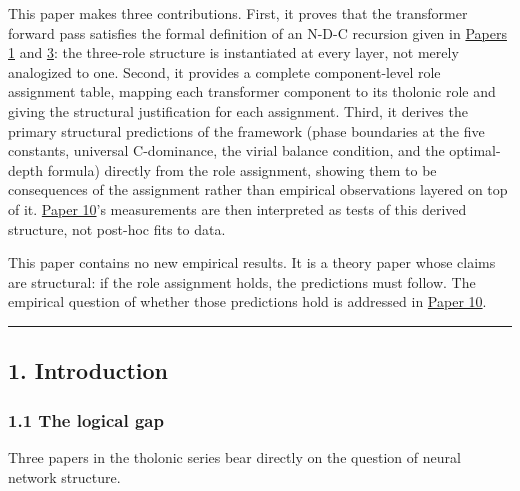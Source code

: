 \documentclass[
  11pt,
  letterpaper,
]{article}
\begin{document}
This paper makes three contributions. First, it proves that the
transformer forward pass satisfies the formal definition of an N-D-C
recursion given in
\href{https://github.com/baardev/truevalue/blob/main/docnav/Research/papers/1_recursive-tholonic-five-constants/1_recursive-tholonic-five-constants.pdf}{Papers
1} and
\href{https://github.com/baardev/truevalue/blob/main/docnav/Research/papers/3_minimal-recursive-triadic-framework/3_minimal-recursive-triadic-framework.pdf}{3}:
the three-role structure is instantiated at every layer, not merely
analogized to one. Second, it provides a complete component-level role
assignment table, mapping each transformer component to its tholonic
role and giving the structural justification for each assignment. Third,
it derives the primary structural predictions of the framework (phase
boundaries at the five constants, universal C-dominance, the virial
balance condition, and the optimal-depth formula) directly from the role
assignment, showing them to be consequences of the assignment rather
than empirical observations layered on top of it.
\href{https://github.com/baardev/truevalue/blob/main/docnav/Research/papers/10_tholonic-neural-architecture/10_tholonic-neural-architecture.pdf}{Paper
10}'s measurements are then interpreted as tests of this derived
structure, not post-hoc fits to data.

This paper contains no new empirical results. It is a theory paper whose
claims are structural: if the role assignment holds, the predictions
must follow. The empirical question of whether those predictions hold is
addressed in
\href{https://github.com/baardev/truevalue/blob/main/docnav/Research/papers/10_tholonic-neural-architecture/10_tholonic-neural-architecture.pdf}{Paper
10}.

\begin{center}\rule{0.5\linewidth}{0.5pt}\end{center}

\subsection{1. Introduction}\label{introduction}

\subsubsection{1.1 The logical gap}\label{the-logical-gap}

Three papers in the tholonic series bear directly on the question of
neural network structure.
\end{document}
